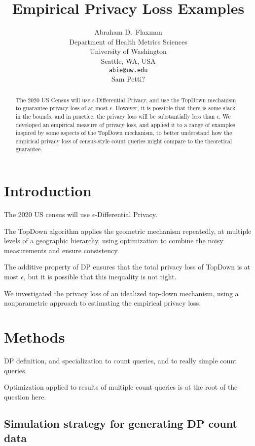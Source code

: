 \documentclass{article}
\title{Empirical Privacy Loss Examples}
\author{%
  Abraham D.~Flaxman \\
  Department of Health Metrics Sciences\\
  University of Washington\\
  Seattle, WA, USA \\
  \texttt{abie@uw.edu} \\
  \And
  Sam Petti? \\
}
\begin{document}
\maketitle

\begin{abstract}
  The 2020 US Census will use $\epsilon$-Differential Privacy, and use the TopDown mechanism to guarantee privacy loss of at most $\epsilon$.  However, it is possible that there is some slack in the bounds, and in practice, the privacy loss will be substantially less than $\epsilon$.  We developed an empirical measure of privacy loss, and applied it to a range of examples inspired by some aspects of the TopDown mechanism, to better understand how the empirical privacy loss of census-style count queries might compare to the theoretical guarantee.
\end{abstract}

\section{Introduction}

The 2020 US census will use $\epsilon$-Differential Privacy.

The TopDown algorithm applies the geometric mechanism repeatedly, at multiple levels of a geographic hierarchy, using optimization to combine the noisy measurements and ensure consistency.

The additive property of DP ensures that the total privacy loss of TopDown is at most $\epsilon$, but it is possible that this inequality is not tight.

We investigated the privacy loss of an idealized top-down mechanism, using a nonparametric approach to estimating the empirical privacy loss.

\section{Methods}
\label{methods}

DP definition, and specialization to count queries, and to really simple count queries.

Optimization applied to results of multiple count queries is at the root of the question here.

\subsection{Simulation strategy for generating DP count data}
\end{document}
